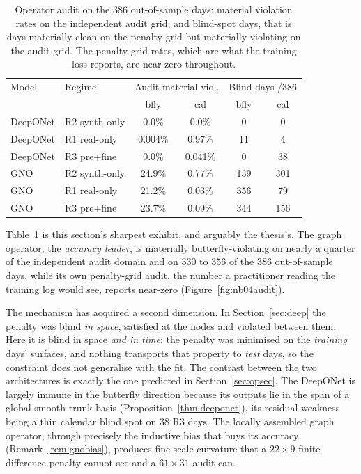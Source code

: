 \begin{table}[htbp]\centering\small
\caption{Operator audit on the $386$ out-of-sample days: material violation rates on the
independent audit grid, and blind-spot days, that is days materially clean on the penalty grid
but materially violating on the audit grid. The penalty-grid rates, which are what the training
loss reports, are near zero throughout. }
\label{tab:opaudit}
\begin{tabular}{llcccc}
\toprule
Model & Regime & \multicolumn{2}{c}{Audit material viol.} & \multicolumn{2}{c}{Blind days /386} \\
 & & bfly & cal & bfly & cal \\
\midrule
DeepONet & R2 synth-only & 0.0\%   & 0.0\%   & 0   & 0 \\
DeepONet & R1 real-only  & 0.004\% & 0.97\%  & 11  & 4 \\
DeepONet & R3 pre+fine   & 0.0\%   & 0.041\% & 0   & 38 \\
GNO      & R2 synth-only & 24.9\%  & 0.77\%  & 139 & 301 \\
GNO      & R1 real-only  & 21.2\%  & 0.03\%  & 356 & 79 \\
GNO      & R3 pre+fine   & 23.7\%  & 0.09\%  & 344 & 156 \\
\bottomrule
\end{tabular}
\end{table}

Table~\ref{tab:opaudit} is this section's sharpest exhibit, and arguably the thesis's. The
graph operator, the \emph{accuracy leader}, is materially butterfly-violating on nearly a
quarter of the independent audit domain and on $330$ to $356$ of the $386$ out-of-sample days,
while its own penalty-grid audit, the number a practitioner reading the training log would
see, reports near-zero (Figure~\ref{fig:nb04audit}).

The mechanism has acquired a second dimension. In Section~\ref{sec:deep} the penalty was blind
\emph{in space}, satisfied at the nodes and violated between them. Here it is blind in space
\emph{and in time}: the penalty was minimised on the \emph{training} days' surfaces, and
nothing transports that property to \emph{test} days, so the constraint does not generalise
with the fit. The contrast between the two architectures is exactly the one predicted in
Section~\ref{sec:opsec}. The DeepONet is largely immune in the butterfly direction because its
outputs lie in the span of a global smooth trunk basis (Proposition~\ref{thm:deeponet}), its
residual weakness being a thin calendar blind spot on $38$ R3 days. The locally assembled
graph operator, through precisely the inductive bias that buys its accuracy
(Remark~\ref{rem:gnobias}), produces fine-scale curvature that a $22\times9$ finite-difference
penalty cannot see and a $61\times31$ audit can.


